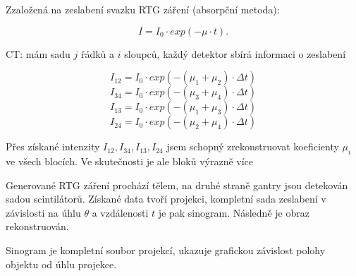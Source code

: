 Zzaložená na zeslabení svazku RTG záření (absorpční metoda):

$$ I = I_0 \cdot exp(-\mu\cdot t). $$

CT: mám sadu $j$ řádků a $i$ sloupců, každý detektor sbírá informaci o zeslabení

$$I_{12} = I_{0} \cdot exp(-(\mu_{1} + \mu_{2})\cdot \Delta t)$$
$$I_{34} = I_{0} \cdot exp(-(\mu_{3} + \mu_{4})\cdot \Delta t)$$
$$I_{13} = I_{0} \cdot exp(-(\mu_{1} + \mu_{3})\cdot \Delta t)$$
$$I_{24} = I_{0} \cdot exp(-(\mu_{2} + \mu_{4})\cdot \Delta t)$$

Přes získané intenzity $I_{12}, I_{34}, I_{13}, I_{24}$ jsem schopný zrekonstruovat koeficienty $\mu_{i}$ ve všech blocích. Ve skutečnosti je ale bloků výrazně více

Generované RTG záření prochází tělem, na druhé straně gantry jsou detekován sadou scintilátorů. Získané data tvoří projekci, kompletní sada zeslabení v závislosti na úhlu $\theta$ a vzdálenosti $t$ je pak sinogram. Následně je obraz rekonstruován.

Sinogram je kompletní soubor projekcí, ukazuje grafickou závislost polohy objektu od úhlu projekce.

